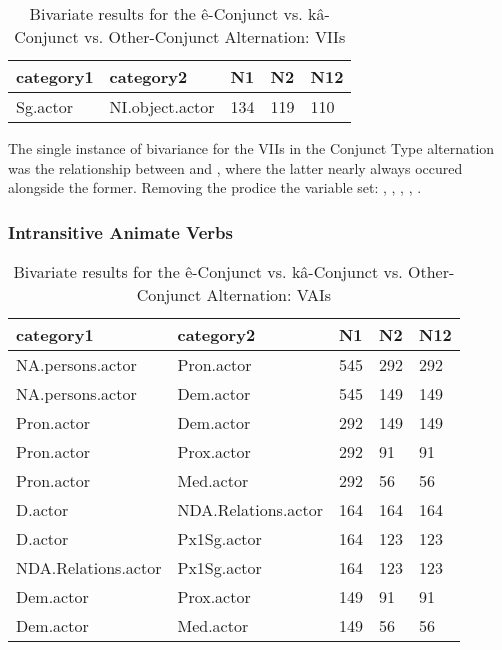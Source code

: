 \FloatBarrier
\begin{table}[H]
\centering
\begin{tabular}{lllll}
\toprule
category1        & category2  & N1   & N2   & N12 \\
\midrule
Sg.actor & NI.object.actor & 134 & 119 & 110 \\
\bottomrule
\end{tabular}
\caption{
   Bivariate results for the ê-Conjunct vs. kâ-Conjunct vs. Other-Conjunct Alternation: VIIs \\ \label{tab:iicnjuni}
  }
\end{table}
The single instance of bivariance for the VIIs in the Conjunct Type alternation was the relationship between  and , where the latter nearly always occured alongside the former. Removing the  prodice the variable set: , , , , .


\subsubsection{Intransitive Animate Verbs}

\begin{table}[H]
\centering
\begin{tabular}{lllll}
\toprule
category1        & category2  & N1   & N2   & N12 \\
\midrule
NA.persons.actor & Pron.actor & 545 & 292 & 292 \\
NA.persons.actor & Dem.actor & 545 & 149 & 149 \\
Pron.actor & Dem.actor & 292 & 149 & 149 \\
Pron.actor & Prox.actor & 292 & 91 & 91 \\
Pron.actor & Med.actor & 292 & 56 & 56 \\
D.actor & NDA.Relations.actor & 164 & 164 & 164 \\
D.actor & Px1Sg.actor & 164 & 123 & 123 \\
NDA.Relations.actor & Px1Sg.actor & 164 & 123 & 123 \\
Dem.actor & Prox.actor & 149 & 91 & 91 \\
Dem.actor & Med.actor & 149 & 56 & 56 \\
\bottomrule
\end{tabular}
\caption{
   Bivariate results for the ê-Conjunct vs. kâ-Conjunct vs. Other-Conjunct Alternation: VAIs \\ \label{tab:aicnjuni}
  }
\end{table}

